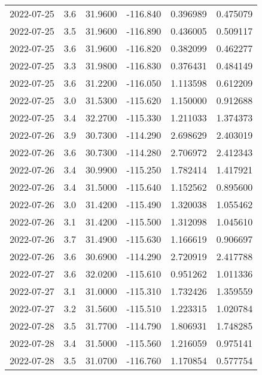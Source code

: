 \begin{tabular}{lrrrrr}
2022-07-25 &       3.6 &  31.9600 &  -116.840 &         0.396989 &         0.475079 \\
2022-07-25 &       3.5 &  31.9600 &  -116.890 &         0.436005 &         0.509117 \\
2022-07-25 &       3.6 &  31.9600 &  -116.820 &         0.382099 &         0.462277 \\
2022-07-25 &       3.3 &  31.9800 &  -116.830 &         0.376431 &         0.484149 \\
2022-07-25 &       3.6 &  31.2200 &  -116.050 &         1.113598 &         0.612209 \\
2022-07-25 &       3.0 &  31.5300 &  -115.620 &         1.150000 &         0.912688 \\
2022-07-25 &       3.4 &  32.2700 &  -115.330 &         1.211033 &         1.374373 \\
2022-07-26 &       3.9 &  30.7300 &  -114.290 &         2.698629 &         2.403019 \\
2022-07-26 &       3.6 &  30.7300 &  -114.280 &         2.706972 &         2.412343 \\
2022-07-26 &       3.4 &  30.9900 &  -115.250 &         1.782414 &         1.417921 \\
2022-07-26 &       3.4 &  31.5000 &  -115.640 &         1.152562 &         0.895600 \\
2022-07-26 &       3.0 &  31.4200 &  -115.490 &         1.320038 &         1.055462 \\
2022-07-26 &       3.1 &  31.4200 &  -115.500 &         1.312098 &         1.045610 \\
2022-07-26 &       3.7 &  31.4900 &  -115.630 &         1.166619 &         0.906697 \\
2022-07-26 &       3.6 &  30.6900 &  -114.290 &         2.720919 &         2.417788 \\
2022-07-27 &       3.6 &  32.0200 &  -115.610 &         0.951262 &         1.011336 \\
2022-07-27 &       3.1 &  31.0000 &  -115.310 &         1.732426 &         1.359559 \\
2022-07-27 &       3.2 &  31.5600 &  -115.510 &         1.223315 &         1.020784 \\
2022-07-28 &       3.5 &  31.7700 &  -114.790 &         1.806931 &         1.748285 \\
2022-07-28 &       3.4 &  31.5000 &  -115.560 &         1.216059 &         0.975141 \\
2022-07-28 &       3.5 &  31.0700 &  -116.760 &         1.170854 &         0.577754 \\

\end{tabular}
